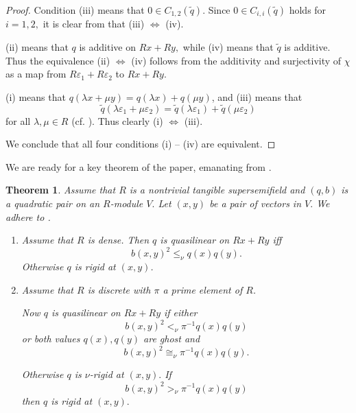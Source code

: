 \documentclass [12pt,a4paper,reqno]{amsart}
\newtheorem{thm}{Theorem} [section]
\begin{document}
\begin{proof}
Condition (iii) means that $0\in C_{1,2}({\tilde q} ).$ Since  $0\in
C_{i,i}({\tilde q} )$ holds for $i=1,2,$ it is clear from {\cite[~\S{{5}}]{QF1}} that (iii)
$\Leftrightarrow$ (iv). {\vskip 1.5mm \noindent}

(ii) means that $q$ is additive on $Rx + Ry,$ while (iv) means
that ${\tilde q} $ is additive. Thus the equivalence (ii)
$\Leftrightarrow$ (iv) follows from the additivity and
surjectivity of $\chi$ as a map from
$R{\varepsilon}_1+R{\varepsilon}_2$ to $Rx+Ry.$ {\vskip 1.5mm \noindent}

(i) means that $q({\lambda} x+ \mu y)=q({\lambda} x)+q(\mu y)$, and (iii) means that $${\tilde q} ({\lambda} {\varepsilon}_1+ \mu {\varepsilon}_2)={\tilde q} ({\lambda} {\varepsilon}_1)+{\tilde q} (\mu {\varepsilon}_2)$$ for all ${\lambda}, \mu \in R$ (cf. {\cite[Definition~{{2.3}}]{QF1}}). Thus clearly (i)
$\Leftrightarrow$ (iii).

We conclude that all four conditions (i) -- (iv) are
equivalent.\end{proof}

We are ready for a key theorem of the paper, emanating from {\cite[~\S{{7}}]{QF1}}.

\begin{thm}\label{thm:II.5.5}
Assume that $R$ is a nontrivial tangible supersemifield and $(q,b)$ is a quadratic
pair on an $R$-module $V.$ Let $(x,y)$ be a pair of vectors in
$V.$ We adhere to \cite[Terminology~7.7]{QF1}.
\begin{enumerate}\item[a)] Assume that $R$ is dense. Then $q$ is
quasilinear on $Rx+Ry$ iff
\begin{equation}\label{eq:II.5.5}
b(x,y)^2\le_\nu q(x)q(y).\end{equation}
Otherwise $q$ is rigid at $(x,y)$.
{\vskip 1.5mm \noindent}

\item[b)] Assume that $R$ is discrete with $\pi$ a prime element of
$R$.

Now $q$ is quasilinear on $Rx+Ry$ if either
\begin{equation}\label{eq:II.5.6}
b(x,y)^2<_\nu \pi^{-1}q(x)q(y)\end{equation} or both values
$q(x),q(y)$ are ghost and
\begin{equation}\label{eq:II.5.7}
b(x,y)^2\cong_\nu \pi^{-1}q(x)q(y).\end{equation}
 
 Otherwise $q$ is $\nu$-rigid at $(x,y). $ If
 \begin{equation}\label{eq:II.5.8}
 b(x,y)^2>_\nu \pi^{-1}q(x)q(y)\end{equation}
 then $q$ is rigid at $(x,y).$\end{enumerate}
\end{thm}
\end{document}
